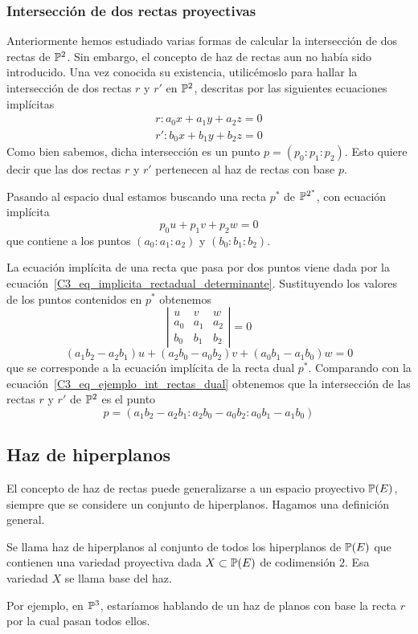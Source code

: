 \subsubsection{Intersección de dos rectas proyectivas}
Anteriormente hemos estudiado varias formas de calcular la intersección de dos rectas de $\mathbb{P}^2$. Sin embargo, el concepto de haz de rectas aun no había sido introducido. Una vez conocida su existencia, utilicémoslo para hallar la intersección de dos rectas $r$ y $r'$ en $\mathbb{P}^2$, descritas por las siguientes ecuaciones implícitas
\begin{equation*}
	\begin{split}
		r:a_0x+a_1y+a_2z=0\\
		r':b_0x+b_1y+b_2z=0
	\end{split}
\end{equation*}
Como bien sabemos, dicha intersección es un punto $p=(p_0:p_1:p_2)$. Esto quiere decir que las dos rectas $r$ y $r'$ pertenecen al haz de rectas con base $p$. 

Pasando al espacio dual estamos buscando una recta $p^*$ de $\mathbb{P}^{2^*}$, con ecuación implícita
\begin{equation}
	\label{C3_eq_ejemplo_int_rectas_dual}
	p_0u+p_1v+p_2w=0
\end{equation}
que contiene a los puntos $(a_0:a_1:a_2)$ y $(b_0:b_1:b_2)$. 

La ecuación implícita de una recta que pasa por dos puntos viene dada por la ecuación~\eqref{C3_eq_implicita_rectadual_determinante}. Sustituyendo los valores de los puntos contenidos en $p^*$ obtenemos
\begin{equation*}
	\left| \begin{array}{ccc}
	u & v & w \\
	a_0 & a_1 & a_2\\
	b_0 & b_1 & b_2
	\end{array}\right| =0
\end{equation*}
\begin{equation*}
	(a_1b_2-a_2b_1)u+(a_2b_0-a_0b_2)v+(a_0b_1-a_1b_0)w=0
\end{equation*}
que se corresponde a la ecuación implícita de la recta dual $p^*$. Comparando con la ecuación~\eqref{C3_eq_ejemplo_int_rectas_dual} obtenemos que la intersección de las rectas $r$ y $r'$ de $\mathbb{P}^2$ es el punto
\begin{equation*}
	p=(a_1b_2-a_2b_1:a_2b_0-a_0b_2:a_0b_1-a_1b_0)
\end{equation*}
\subsection{Haz de hiperplanos}
El concepto de haz de rectas puede generalizarse a un espacio proyectivo $\mathbb{P}(E)$, siempre que se considere un conjunto de hiperplanos. Hagamos una definición general.
\begin{defi}
	Se llama haz de hiperplanos al conjunto de todos los hiperplanos de $\mathbb{P}(E)$ que contienen una variedad proyectiva dada $X\subset\mathbb{P}(E)$ de codimensión $2$. Esa variedad $X$ se llama base del haz.
\end{defi}
Por ejemplo, en $\mathbb{P}^3$, estaríamos hablando de un haz de planos con base la recta $r$ por la cual pasan todos ellos.

